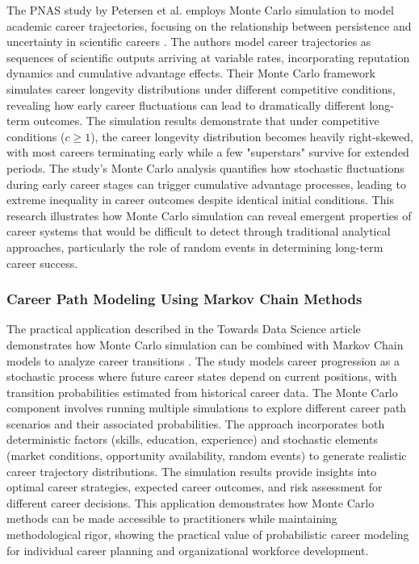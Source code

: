 \documentclass[main.tex]{subfiles}
\begin{document}
The PNAS study by Petersen et al. employs Monte Carlo simulation to model academic career trajectories, focusing on the relationship between persistence and uncertainty in scientific careers \parencite{petersen2012}. The authors model career trajectories as sequences of scientific outputs arriving at variable rates, incorporating reputation dynamics and cumulative advantage effects. Their Monte Carlo framework simulates career longevity distributions under different competitive conditions, revealing how early career fluctuations can lead to dramatically different long-term outcomes. The simulation results demonstrate that under competitive conditions ($c \geq 1$), the career longevity distribution becomes heavily right-skewed, with most careers terminating early while a few "superstars" survive for extended periods. The study's Monte Carlo analysis quantifies how stochastic fluctuations during early career stages can trigger cumulative advantage processes, leading to extreme inequality in career outcomes despite identical initial conditions. This research illustrates how Monte Carlo simulation can reveal emergent properties of career systems that would be difficult to detect through traditional analytical approaches, particularly the role of random events in determining long-term career success.

\subsubsection{Career Path Modeling Using Markov Chain Methods}

The practical application described in the Towards Data Science article demonstrates how Monte Carlo simulation can be combined with Markov Chain models to analyze career transitions \parencite{datascience2025}. The study models career progression as a stochastic process where future career states depend on current positions, with transition probabilities estimated from historical career data. The Monte Carlo component involves running multiple simulations to explore different career path scenarios and their associated probabilities. The approach incorporates both deterministic factors (skills, education, experience) and stochastic elements (market conditions, opportunity availability, random events) to generate realistic career trajectory distributions. The simulation results provide insights into optimal career strategies, expected career outcomes, and risk assessment for different career decisions. This application demonstrates how Monte Carlo methods can be made accessible to practitioners while maintaining methodological rigor, showing the practical value of probabilistic career modeling for individual career planning and organizational workforce development.
\end{document}
